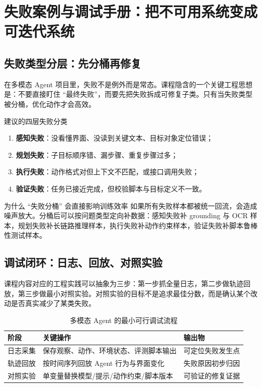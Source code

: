 \section{失败案例与调试手册：把不可用系统变成可迭代系统}

\subsection{失败类型分层：先分桶再修复}
在多模态 Agent 项目里，失败不是例外而是常态。课程隐含的一个关键工程思想是：不要直接盯住 ``最终失败''，而要先把失败拆成可修复子类。只有当失败类型被分桶，优化动作才会高效。

\begin{importantbox}{建议的四层失败分类}
\begin{enumerate}
    \item \textbf{感知失败}：没看懂界面、没读到关键文本、目标对象定位错误；
    \item \textbf{规划失败}：子目标顺序错、漏步骤、重复步骤过多；
    \item \textbf{执行失败}：动作格式对但上下文不匹配，或接口调用失败；
    \item \textbf{验证失败}：任务已接近完成，但校验脚本与目标定义不一致。
\end{enumerate}
\end{importantbox}

\begin{knowledgebox}{为什么 ``失败分桶'' 会直接影响训练效率}
如果所有失败样本都被统一回流，会造成噪声放大。分桶后可以按问题类型定向补数据：感知失败补 grounding 与 OCR 样本，规划失败补长链路推理样本，执行失败补动作约束样本，验证失败补脚本鲁棒性测试样本。
\end{knowledgebox}

\subsection{调试闭环：日志、回放、对照实验}
课程内容对应的工程实践可以抽象为三步：第一步抓全量日志，第二步做轨迹回放，第三步做最小对照实验。对照实验的目标不是追求最佳分数，而是确认某个改动是否真实减少了某类失败。

\begin{table}[H]
\centering
\begin{tabular}{p{2.6cm}p{4.6cm}p{4.0cm}}
\toprule
\textbf{阶段} & \textbf{关键操作} & \textbf{输出物} \\
\midrule
日志采集 & 保存观察、动作、环境状态、评测脚本输出 & 可定位失败发生点 \\
轨迹回放 & 按时间序列回放 Agent 行为与界面变化 & 失败原因初步归因 \\
对照实验 & 单变量替换模型/提示/动作约束/脚本版本 & 可验证的修复证据 \\
\bottomrule
\end{tabular}
\caption{多模态 Agent 的最小可行调试流程}
\end{table}

